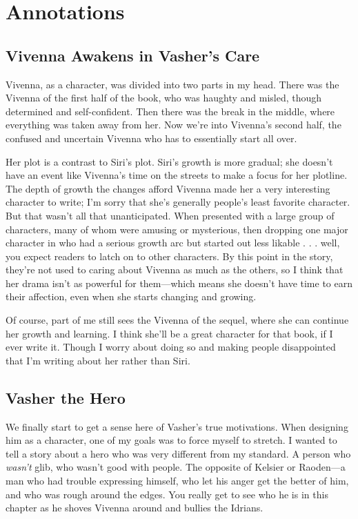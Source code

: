 \section*{Annotations}

\subsection*{Vivenna Awakens in Vasher’s Care}

Vivenna, as a character, was divided into two parts in my head. There was the Vivenna of the first half of the book, who was haughty and misled, though determined and self-confident. Then there was the break in the middle, where everything was taken away from her. Now we’re into Vivenna’s second half, the confused and uncertain Vivenna who has to essentially start all over.

Her plot is a contrast to Siri’s plot. Siri’s growth is more gradual; she doesn’t have an event like Vivenna’s time on the streets to make a focus for her plotline. The depth of growth the changes afford Vivenna made her a very interesting character to write; I’m sorry that she’s generally people’s least favorite character. But that wasn’t all that unanticipated. When presented with a large group of characters, many of whom were amusing or mysterious, then dropping one major character in who had a serious growth arc but started out less likable . . . well, you expect readers to latch on to other characters. By this point in the story, they’re not used to caring about Vivenna as much as the others, so I think that her drama isn’t as powerful for them—which means she doesn’t have time to earn their affection, even when she starts changing and growing.

Of course, part of me still sees the Vivenna of the sequel, where she can continue her growth and learning. I think she’ll be a great character for that book, if I ever write it. Though I worry about doing so and making people disappointed that I’m writing about her rather than Siri.

\subsection*{Vasher the Hero}

We finally start to get a sense here of Vasher’s true motivations. When designing him as a character, one of my goals was to force myself to stretch. I wanted to tell a story about a hero who was very different from my standard. A person who \textit{wasn’t} glib, who wasn’t good with people. The opposite of Kelsier or Raoden—a man who had trouble expressing himself, who let his anger get the better of him, and who was rough around the edges. You really get to see who he is in this chapter as he shoves Vivenna around and bullies the Idrians.

